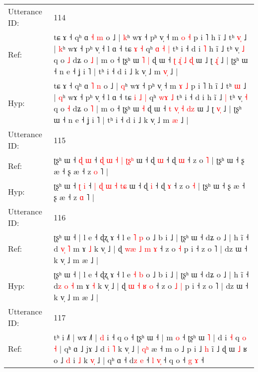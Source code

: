 \documentclass[10pt]{article}
\DeclareRobustCommand{\hl}[1]{{\textcolor{red}{#1}}}
\begin{document}
\begin{longtable}{ll}
 \\
\midrule
Utterance ID: & 114 \\
Ref: & tɕ ɤ ˧ qʰ ɑ \hl{˧} \hl{m} o ˩ | \hl{k}ʰ wɤ ˧ pʰ v̩ ˧ m \hl{o} \hl{˧} p i ˥ h ĩ ˩ tʰ \hl{v}\hl{̩} ˩ | \hl{k}ʰ wɤ ˧ pʰ v̩ ˧ l ɑ ˧ tɕ\hl{}\hl{} \hl{ɤ} \hl{˧} qʰ \hl{ɑ}\hl{ }\hl{˧} \hl{|} tʰ i ˧ d i\hl{ }\hl{˥} h ĩ ˩\hl{}\hl{} tʰ v̩ \hl{˩} q o \hl{˩} dʑ o \hl{˩} | m o ˧ ʈʂʰ ɯ\hl{ }\hl{˥} \hl{|} ɖ ɯ ˧ \hl{ʈ} \hl{ɻ}\hl{̍} \hl{˩} \hl{}\hl{ɖ} ɯ ˩ ʈ \hl{ɻ}\hl{̍} ˩ | ʈʂʰ ɯ ˧ n e ˧ ʝ i ˥ | tʰ i ˧ d i ˩ k v̩ ˩ m \hl{v}\hl{̩} ˩ |
 \\
Hyp: & tɕ ɤ ˧ qʰ ɑ \hl{˥} \hl{n} o ˩ | \hl{q}ʰ wɤ ˧ pʰ v̩ ˧ m \hl{ɤ} \hl{˩} p i ˥ h ĩ ˩ tʰ \hl{}\hl{ɯ} ˩ | \hl{q}ʰ wɤ ˧ pʰ v̩ ˧ l ɑ ˧ tɕ\hl{ }\hl{i} \hl{˩} \hl{|} qʰ \hl{}\hl{w}\hl{ɤ} \hl{˩} tʰ i ˧ d i\hl{}\hl{} h ĩ ˩\hl{ }\hl{|} tʰ v̩ \hl{˧} q o \hl{˧} dʑ o \hl{˥} | m o ˧ ʈʂʰ ɯ\hl{}\hl{} \hl{˧} ɖ ɯ ˧ \hl{t} \hl{v}\hl{̩} \hl{˧} \hl{d}\hl{z} ɯ ˩ ʈ \hl{v}\hl{̩} ˩ | ʈʂʰ ɯ ˧ n e ˧ ʝ i ˥ | tʰ i ˧ d i ˩ k v̩ ˩ m \hl{}\hl{æ} ˩ |
 \\
\midrule
Utterance ID: & 115 \\
Ref: & ʈʂʰ ɯ ˧ \hl{ɖ} \hl{ɯ} ˧ \hl{ɖ} \hl{ɯ} \hl{˧} \hl{|} \hl{ʈ}\hl{ʂ}\hl{ʰ} ɯ ˧ ɖ \hl{ɯ} ˧ ɖ \hl{ɯ} ˧ z o \hl{˥} | ʈʂʰ ɯ ˧ ʂ æ ˧ ʂ æ ˧ z \hl{o} ˥ |
 \\
Hyp: & ʈʂʰ ɯ ˧ \hl{ʈ} \hl{i} ˧ \hl{|} \hl{ɖ} \hl{ɯ} \hl{˧} \hl{}\hl{t}\hl{ɕ} ɯ ˧ ɖ \hl{i} ˧ ɖ \hl{ɤ} ˧ z o \hl{˧} | ʈʂʰ ɯ ˧ ʂ æ ˧ ʂ æ ˧ z \hl{ɑ} ˥ |
 \\
\midrule
Utterance ID: & 116 \\
Ref: & ʈʂʰ ɯ ˧ | l e ˧ ɖʐ ɤ ˧ l e \hl{˥} \hl{p} o ˩ b i ˩ | ʈʂʰ ɯ ˧ dʑ o ˩ | h ĩ ˧ d\hl{ }\hl{v}\hl{̩} \hl{˥} m ɤ \hl{˩} k v̩ ˩ | ɖ \hl{w}\hl{æ} \hl{˩} \hl{m} \hl{ɤ} ˧ z o\hl{}\hl{} \hl{˧} p i ˧ z o ˥ | dz ɯ ˧ k v̩ ˩ m æ ˩ |
 \\
Hyp: & ʈʂʰ ɯ ˧ | l e ˧ ɖʐ ɤ ˧ l e \hl{˧} \hl{b} o ˩ b i ˩ | ʈʂʰ ɯ ˧ dʑ o ˩ | h ĩ ˧ d\hl{z}\hl{ }\hl{o} \hl{˧} m ɤ \hl{˧} k v̩ ˩ | ɖ \hl{}\hl{ɯ} \hl{˧} \hl{ʁ} \hl{o} ˧ z o\hl{ }\hl{˩} \hl{|} p i ˧ z o ˥ | dz ɯ ˧ k v̩ ˩ m æ ˩ |
 \\
\midrule
Utterance ID: & 117 \\
Ref: & tʰ i ˩˥ | wɤ ˩˥ | \hl{d} i ˧ q o ˧ ʈʂʰ ɯ ˧ | m \hl{}\hl{o} ˧ ʈʂʰ ɯ \hl{˥} | d i \hl{˧} q\hl{ }\hl{o}\hl{ }\hl{˧} | qʰ ɑ ˩ jɤ ˩ d\hl{} \hl{i} \hl{˥} k v̩ ˩ |\hl{ }\hl{q}\hl{ʰ} æ ˧ m o ˩ p i ˩ \hl{h} ĩ ˩\hl{}\hl{} ɖ ɯ \hl{˩} ʁ o ˩ \hl{}\hl{d} i \hl{˩} k \hl{v}\hl{̩} ˩ | qʰ ɑ ˧ d\hl{z} \hl{e} ˧ \hl{l} \hl{v}\hl{̩} ˧ q o ˧ \hl{}\hl{g} \hl{}\hl{ɤ} ˧\hl{}\hl{}
 \\

\end{longtable}
\end{document}
